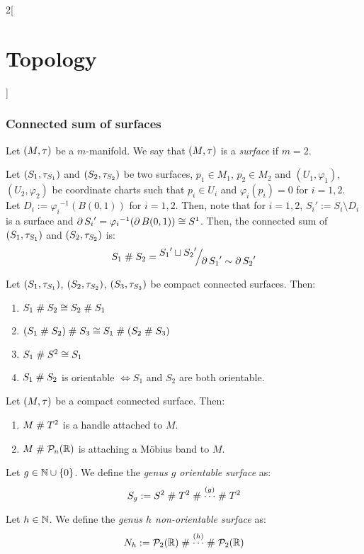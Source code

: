 \documentclass[../../../main_math.tex]{subfiles}
\begin{document}
\begin{multicols}{2}[\section{Topology}]
  \subsubsection{Connected sum of surfaces}
  \begin{definition}
    Let $(M,\tau)$ be a $m$-manifold. We say that $(M,\tau)$ is a \emph{surface} if $m=2$.
  \end{definition}
  \begin{proposition}
    Let $(S_1,\tau_{S_1})$ and $(S_2,\tau_{S_2})$ be two surfaces, $p_1\in M_1$, $p_2\in M_2$ and $(U_1,\varphi_1)$, $(U_2,\varphi_2)$ be coordinate charts such that $p_i\in U_i$ and $\varphi_i(p_i)=0$ for $i=1,2$. Let $D_i:={\varphi_i}^{-1}(B(0,1))$ for $i=1,2$. Then, note that for $i=1,2$, ${S_i}':=S_i\setminus D_i$ is a surface and $\operatorname{\partial} {S_i}'={\varphi_i}^{-1}(\operatorname{\partial} B(0,1))\cong S^1$. Then, the connected sum of $(S_1,\tau_{S_1})$ and $(S_2,\tau_{S_2})$ is: $$S_1\conn S_2=\quot{{S_1}'\sqcup{S_2}'}{\Fr {S_1}'\sim\Fr {S_2}'}$$
  \end{proposition}
  \begin{proposition}
    Let $(S_1,\tau_{S_1})$, $(S_2,\tau_{S_2})$, $(S_3,\tau_{S_3})$ be compact connected surfaces. Then:
    \begin{enumerate}
      \item $S_1\mathrel{\#}  S_2\cong S_2\mathrel{\#}  S_1$
      \item $(S_1\mathrel{\#}  S_2)\mathrel{\#}  S_3\cong S_1\mathrel{\#}  (S_2\mathrel{\#}  S_3)$
      \item $S_1\mathrel{\#} S^2\cong S_1$
      \item $S_1\mathrel{\#}  S_2$ is orientable $\iff S_1$ and $S_2$ are both orientable.
    \end{enumerate}
  \end{proposition}
  \begin{proposition}
    Let $(M,\tau)$ be a compact connected surface. Then:
    \begin{enumerate}
      \item $M\mathrel{\#}  T^2$ is a handle attached to $M$.
      \item $M\mathrel{\#} \mathcal{P}_n(\mathbb{R})$ is attaching a Möbius band to $M$.
    \end{enumerate}
  \end{proposition}
  \begin{definition}\label{TOP:genus}
    Let $g\in\mathbb{N}\cup\{0\}$. We define the \emph{genus $g$ orientable surface} as: $$S_g:=S^2\mathrel{\#}  T^2\mathrel{\#} \overset{(g)}{\cdots}\mathrel{\#}  T^2$$
  \end{definition}
  \begin{definition}
    Let $h\in\mathbb{N}$. We define the \emph{genus $h$ non-orientable surface} as: $$N_h:=\mathcal{P}_2(\mathbb{R})\mathrel{\#} \overset{(h)}{\cdots}\mathrel{\#}  \mathcal{P}_2(\mathbb{R})$$
  \end{definition}
  \begin{center}
    \begin{minipage}{\linewidth}
      \centering
      
    \end{minipage}
  \end{center}

\end{multicols}
\end{document}
